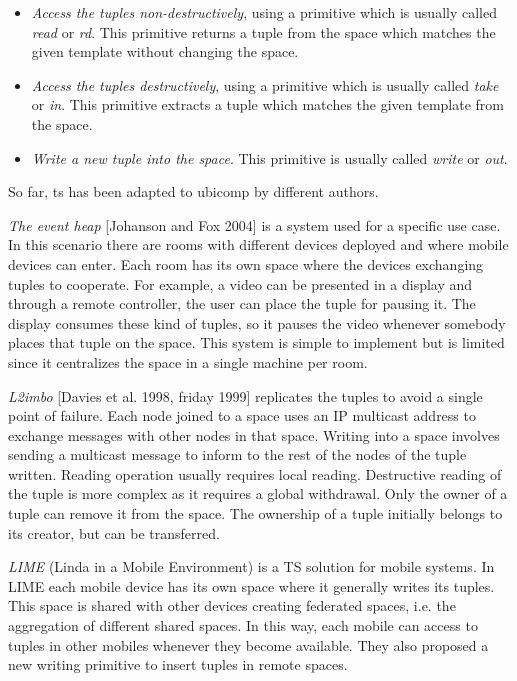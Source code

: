 \begin{itemize}
  \item \emph{Access the tuples non-destructively}, using a primitive which is usually called \emph{read} or \emph{rd}.
	This primitive returns a tuple from the space which matches the given template without changing the space.
  \item \emph{Access the tuples destructively}, using a primitive which is usually called \emph{take} or \emph{in}.
	This primitive extracts a tuple which matches the given template from the space.
  \item \emph{Write a new tuple into the space}. This primitive is usually called \emph{write} or \emph{out}.
\end{itemize}

So far, \acl{ts} has been adapted to \acl{ubicomp} by different authors.

\emph{The event heap} [Johanson and Fox 2004] is a system used for a specific use case. %
In this scenario there are rooms with different devices deployed and where mobile devices can enter.
Each room has its own space where the devices exchanging tuples to cooperate.
For example, a video can be presented in a display and through a remote controller, the user can place the tuple for pausing it.
The display consumes these kind of tuples, so it pauses the video whenever somebody places that tuple on the space.
This system is simple to implement but is limited since it centralizes the space in a single machine per room. %


\emph{L2imbo} [Davies et al. 1998, friday 1999] replicates the tuples to avoid a single point of failure. %
Each node joined to a space uses an IP multicast address to exchange messages with other nodes in that space.
Writing into a space involves sending a multicast message to inform to the rest of the nodes of the tuple written.
Reading operation usually requires local reading.
Destructive reading of the tuple is more complex as it requires a global withdrawal.
Only the owner of a tuple can remove it from the space.
The ownership of a tuple initially belongs to its creator, but can be transferred. %


\emph{LIME} (Linda in a Mobile Environment) \cite{picco_lime:_1999} is a TS solution for mobile systems.
In LIME each mobile device has its own space where it generally writes its tuples.
This space is shared with other devices creating federated spaces, i.e. the aggregation of different shared spaces.
In this way, each mobile can access to tuples in other mobiles whenever they become available.
They also proposed a new writing primitive to insert tuples in remote spaces.

